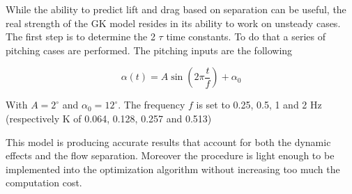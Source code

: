 \par While the ability to predict lift and drag based on separation can be useful, the real strength of the GK model resides in its ability to work on unsteady cases.
The first step is to determine the 2 $\tau$ time constants. 
To do that a series of pitching cases are performed. 
The pitching inputs are the following

\begin{equation}
	\alpha\left( t \right)= A \sin \left( 2 \pi \frac{t}{f} \right) + \alpha_0
	\label{eqn:pitch_input}
\end{equation}

With $A=2^\circ$ and $\alpha_0=12^\circ$.
The frequency $f$ is set to 0.25, 0.5, 1 and 2 Hz (respectively K of 0.064, 0.128, 0.257 and 0.513)


\par This model is producing accurate results that account for both the dynamic effects and the flow separation.
Moreover the procedure is light enough to be implemented into the optimization algorithm without increasing too much the computation cost.
